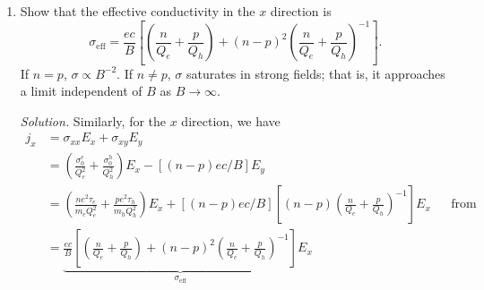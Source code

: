 \documentclass{homework}
\newcommand{\solution}{	\vspace{1em} \textit{Solution.} \quad }
\begin{document}
\begin{enumerate}
\begin{enumerate}
				\item Show that the effective conductivity in the $x$ direction is 
				$$\sigma_\mathrm{eff} = \frac{ec}{B} \left[
					\left(\frac{n}{Q_e} + \frac{p}{Q_h}\right)
					+ (n-p)^2 \left(
						\frac{n}{Q_e} + \frac{p}{Q_h}
					\right)^{-1}
				\right].$$
				If $n=p$, $\sigma \propto B^{-2}$. If $n \ne p$, $\sigma$ saturates in strong fields; that is, it approaches a limit independent of $B$ as $B \to \infty$.
				
				\solution Similarly, for the $x$ direction, we have \begin{align*}
					j_x & = \sigma_{xx} E_x + \sigma_{xy} E_y \\
						& = \left( \frac{\sigma_0^e}{Q_e^2} + \frac{\sigma_0^h}{Q_h^2} \right) E_x - \left[(n-p)ec/B\right] E_y \\
						& = \left(
							\frac{ne^2 \tau_e}{m_e Q_e^2}
							+ \frac{pe^2 \tau_h}{m_h Q_h^2} 
						\right) E_x
						+ \left[
							(n-p) ec/B
						\right] \left[
							(n-p) \left(
								\frac{n}{Q_e}
								+ \frac{p}{Q_h}
							\right)^{-1}
						\right] E_x && \text{from (b)} \\
						& =  \underbrace{ \frac{ec}{B} \left[
						\left(\frac{n}{Q_e} + \frac{p}{Q_h}\right)
						+ (n-p)^2 \left(
						\frac{n}{Q_e} + \frac{p}{Q_h}
						\right)^{-1}
						\right]}_{\sigma_\mathrm{eff}} E_x
				\end{align*}
			\end{enumerate}
	\end{enumerate}
\end{document}
